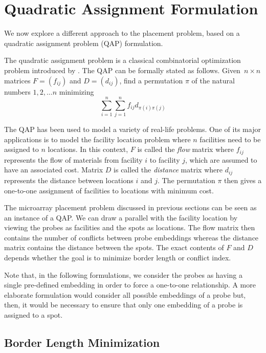 \documentclass{bioinfo}
\begin{document}
\section{Quadratic Assignment Formulation}

We now explore a different approach to the placement problem, based on a quadratic assignment problem (QAP) formulation.

The quadratic assignment problem is a classical combinatorial optimization problem introduced by \citealp{KOOPMANS57}. The QAP can be formally stated as follows. Given~$n \times n$ matrices $F = (f_{ij})$ and $D = (d_{ij})$, find a permutation $\pi$ of the natural numbers $1, 2, \ldots n$ minimizing
\begin{equation}
\label{eq:qap_def}
\sum_{i=1}^{n} \sum_{j=1}^{n} f_{ij} d_{\pi(i)\pi(j)}
\end{equation}

The QAP has been used to model a variety of real-life problems. One of its major applications is to model the facility location problem where $n$ facilities need to be assigned to $n$ locations. In this context, $F$ is called the \emph{flow} matrix where $f_{ij}$ represents the flow of materials from facility $i$ to facility $j$, which are assumed to have an associated cost. Matrix $D$ is called the \emph{distance} matrix where $d_{ij}$ represents the distance between locations $i$ and $j$. The permutation $\pi$ then gives a one-to-one assignment of facilities to locations with minimum cost.

The microarray placement problem discussed in previous sections can be seen as an instance of a QAP. We can draw a parallel with the facility location by viewing the probes as facilities and the spots as locations. The flow matrix then contains the number of conflicts between probe embeddings whereas the distance matrix contains the distance between the spots. The exact contents of $F$ and $D$ depends whether the goal is to minimize border length or conflict index.

Note that, in the following formulations, we consider the probes as having a single pre-defined embedding in order to force a one-to-one relationship. A more elaborate formulation would consider all possible embeddings of a probe but, then, it would be necessary to ensure that only one embedding of a probe is assigned to a spot.

\subsection{Border Length Minimization}
\end{document}
